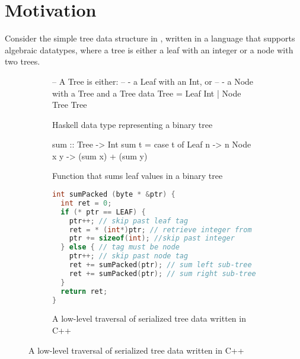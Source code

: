 
\section{Motivation}\label{sec:intro-motivation}

Consider the simple tree data structure in , written in
a language that supports algebraic datatypes, where a tree is either a leaf with
an integer or a node with two trees.

\begin{figure}
\begin{subfigure}{\textwidth}
\begin{code}
-- A Tree is either:
--  - a Leaf with an Int, or
--  - a Node with a Tree and a Tree
data Tree = Leaf Int | Node Tree Tree
\end{code}
\caption{Haskell data type representing a binary tree}
\label{fig:haskell_tree}
\end{subfigure}
\begin{subfigure}{\textwidth}
\begin{code}
sum :: Tree -> Int
sum t = case t of
          Leaf n   -> n
          Node x y -> (sum x) + (sum y)
\end{code}
\caption{Function that sums leaf values in a binary tree}
\label{fig:haskell_sumtree}
\end{subfigure}
\begin{subfigure}{\textwidth}
\begin{lstlisting}[language=C++]
int sumPacked (byte * &ptr) {
  int ret = 0;
  if (* ptr == LEAF) {
    ptr++; // skip past leaf tag
    ret = * (int*)ptr; // retrieve integer from leaf
    ptr += sizeof(int); //skip past integer
  } else { // tag must be node
    ptr++; // skip past node tag
    ret += sumPacked(ptr); // sum left sub-tree
    ret += sumPacked(ptr); // sum right sub-tree
  }
  return ret;
}
\end{lstlisting}
\caption{A low-level traversal of serialized tree data written in C++}
\label{fig:cpp-example}
\end{subfigure}

\end{figure}

